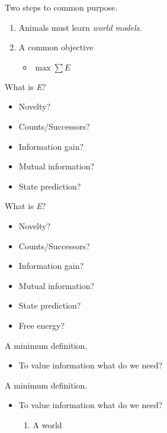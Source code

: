 \documentclass[10pt]{beamer}
\begin{document}
\begin{frame}[fragile]{Two steps to common purpose.}
\begin{enumerate}
    \item Animals must learn \textit{world models}.
    \item A common objective
    \begin{itemize}
        \item $ \max \sum E$
    \end{itemize}
\end{enumerate}
\end{frame}

\begin{frame}[fragile]{What is \textit{E}?}
\begin{itemize}
    \item Novelty?
    \item Counts/Successors?
    \item Information gain?
    \item Mutual information? 
    \item State prediction?
\end{itemize}
\end{frame}

\begin{frame}[fragile]{What is \textit{E}?}
\begin{itemize}
    \item Novelty?
    \item Counts/Successors?
    \item Information gain?
    \item Mutual information?
    \item State prediction?
    \item \alert{Free energy?}
\end{itemize}
\end{frame}

\begin{frame}[fragile]{A minimum definition.}
\begin{itemize}
    \item To value information what do we need?
\end{itemize}
\end{frame}

\begin{frame}[fragile]{A minimum definition.}
\begin{itemize}
    \item To value information what do we need?
    \begin{enumerate}
        \item A world
    \end{enumerate}
\end{itemize}
\end{frame}
\end{document}
